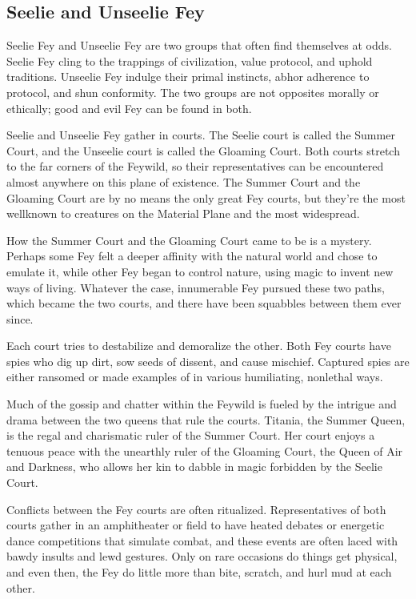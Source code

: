 \documentclass[10pt,a4paper,twoside,bg=print,twocolumn,openany,nodeprecatedcode]{dndbook}
\begin{document}
\subsection{Seelie and Unseelie Fey}
Seelie Fey and Unseelie Fey are two groups that often find themselves at odds. Seelie Fey cling to the trappings of civilization, value protocol, and uphold traditions. Unseelie Fey indulge their primal instincts, abhor adherence to protocol, and shun conformity. The two groups are not opposites morally or ethically; good and evil Fey can be found in both.

Seelie and Unseelie Fey gather in courts. The Seelie court is called the Summer Court, and the Unseelie court is called the Gloaming Court. Both courts stretch to the far corners of the Feywild, so their representatives can be encountered almost anywhere on this plane of existence. The Summer Court and the Gloaming Court are by no means the only great Fey courts, but they're the most wellknown to creatures on the Material Plane and the most widespread.

How the Summer Court and the Gloaming Court came to be is a mystery. Perhaps some Fey felt a deeper affinity with the natural world and chose to emulate it, while other Fey began to control nature, using magic to invent new ways of living. Whatever the case, innumerable Fey pursued these two paths, which became the two courts, and there have been squabbles between them ever since.

Each court tries to destabilize and demoralize the other. Both Fey courts have spies who dig up dirt, sow seeds of dissent, and cause mischief. Captured spies are either ransomed or made examples of in various humiliating, nonlethal ways.

Much of the gossip and chatter within the Feywild is fueled by the intrigue and drama between the two queens that rule the courts. Titania, the Summer Queen, is the regal and charismatic ruler of the Summer Court. Her court enjoys a tenuous peace with the unearthly ruler of the Gloaming Court, the Queen of Air and Darkness, who allows her kin to dabble in magic forbidden by the Seelie Court.

Conflicts between the Fey courts are often ritualized. Representatives of both courts gather in an amphitheater or field to have heated debates or energetic dance competitions that simulate combat, and these events are often laced with bawdy insults and lewd gestures. Only on rare occasions do things get physical, and even then, the Fey do little more than bite, scratch, and hurl mud at each other.
\end{document}
